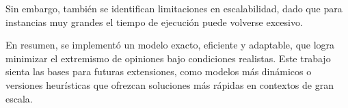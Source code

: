 Sin embargo, también se identifican limitaciones en escalabilidad, dado que para instancias muy grandes el tiempo de ejecución puede volverse excesivo.

En resumen, se implementó un modelo exacto, eficiente y adaptable, que logra minimizar el extremismo de opiniones bajo condiciones realistas. Este trabajo sienta las bases para futuras extensiones, como modelos más dinámicos o versiones heurísticas que ofrezcan soluciones más rápidas en contextos de gran escala.



